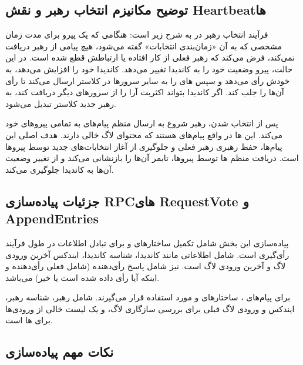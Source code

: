 \documentclass[12pt,a4paper]{article}
\begin{document}
\subsection{توضیح مکانیزم انتخاب رهبر و نقش Heartbeatها}

فرآیند انتخاب رهبر در  به شرح زیر است: هنگامی که یک پیرو برای مدت زمان مشخصی که به آن «زمان‌بندی انتخابات»  گفته می‌شود، هیچ پیامی از رهبر دریافت نمی‌کند، فرض می‌کند که رهبر فعلی از کار افتاده یا ارتباطش قطع شده است. در این حالت، پیرو وضعیت خود را به کاندیدا تغییر می‌دهد. کاندیدا  خود را افزایش می‌دهد، به خودش رأی می‌دهد و سپس های  را به سایر سرورها در کلاستر ارسال می‌کند تا رأی آن‌ها را جلب کند. اگر کاندیدا بتواند اکثریت آرا را از سرورهای دیگر دریافت کند، به رهبر جدید کلاستر تبدیل می‌شود.

پس از انتخاب شدن، رهبر شروع به ارسال منظم پیام‌های  به تمامی پیروهای خود می‌کند. این ها در واقع پیام‌های  هستند که محتوای لاگ خالی دارند. هدف اصلی این پیام‌ها، حفظ رهبری رهبر فعلی و جلوگیری از آغاز انتخابات‌های جدید توسط پیروها است. دریافت منظم ها توسط پیروها، تایمر  آن‌ها را بازنشانی می‌کند و از تغییر وضعیت آن‌ها به کاندیدا جلوگیری می‌کند.

\subsection{جزئیات پیاده‌سازی RPCهای RequestVote و AppendEntries}

پیاده‌سازی این بخش شامل تکمیل ساختارهای  و  برای تبادل اطلاعات در طول فرآیند رأی‌گیری است.  شامل اطلاعاتی مانند  کاندیدا، شناسه کاندیدا، ایندکس آخرین ورودی لاگ و  آخرین ورودی لاگ است.  نیز شامل پاسخ رأی‌دهنده (شامل  فعلی رأی‌دهنده و اینکه آیا رأی داده شده است یا خیر) می‌باشد.

برای پیام‌های ، ساختارهای  و  مورد استفاده قرار می‌گیرند.  شامل  رهبر، شناسه رهبر، ایندکس و  ورودی لاگ قبلی  برای بررسی سازگاری لاگ، و یک لیست خالی از ورودی‌ها  برای ها است.

\subsection{نکات مهم پیاده‌سازی}
\end{document}

